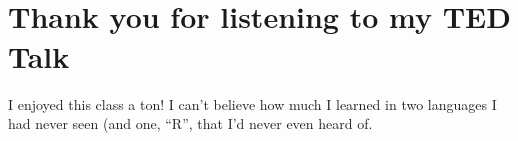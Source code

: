 \documentclass[11pt]{article}
\begin{document}
    \begin{center}
    \end{center}
    { \hspace*{\fill} \\}
    
    \begin{center}
    \end{center}
    { \hspace*{\fill} \\}
    
    \hypertarget{thank-you-for-listening-to-my-ted-talk}{%
\section{Thank you for listening to my TED
Talk}\label{thank-you-for-listening-to-my-ted-talk}}

I enjoyed this class a ton! I can't believe how much I learned in two
languages I had never seen (and one, ``R'', that I'd never even heard
of.


    
    
    
\end{document}
